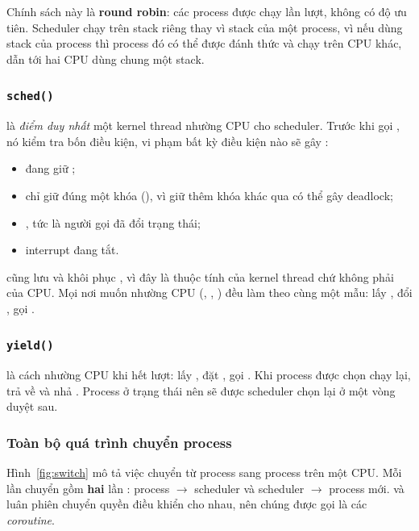 Chính sách này là \textbf{round robin}: các process được chạy lần lượt,
không có độ ưu tiên. Scheduler chạy trên stack riêng thay vì
stack của một process, vì nếu dùng stack của process thì process đó có thể
được đánh thức và chạy trên CPU khác, dẫn tới hai CPU dùng chung một stack.

\subsubsection{\texttt{sched()}}

 là \emph{điểm duy nhất} một kernel thread nhường CPU cho
scheduler. Trước khi gọi , nó
kiểm tra bốn điều kiện, vi phạm bất kỳ điều kiện nào sẽ gây :
\begin{itemize}
  \item đang giữ ;
  \item chỉ giữ đúng một khóa (), vì giữ thêm khóa
        khác qua  có thể gây deadlock;
  \item {}, tức là người gọi đã đổi trạng thái;
  \item interrupt đang tắt.
\end{itemize}
 cũng lưu và khôi phục , vì đây là thuộc tính của
kernel thread chứ không phải của CPU. Mọi nơi muốn nhường CPU (,
, ) đều làm theo cùng một mẫu: lấy , đổi
, gọi .

\subsubsection{\texttt{yield()}}

 là cách nhường CPU khi hết lượt: lấy , đặt
, gọi . Khi process được chọn chạy lại,
 trả về và  nhả . Process ở trạng
thái  nên sẽ được scheduler chọn lại ở một vòng duyệt sau.

\subsubsection{Toàn bộ quá trình chuyển process}

Hình~\ref{fig:switch} mô tả việc
chuyển từ process  sang process  trên một CPU. Mỗi lần
chuyển gồm \textbf{hai} lần : process $\to$ scheduler và
scheduler $\to$ process mới.  và  luân phiên
chuyển quyền điều khiển cho nhau, nên chúng được gọi là các \emph{coroutine}.

